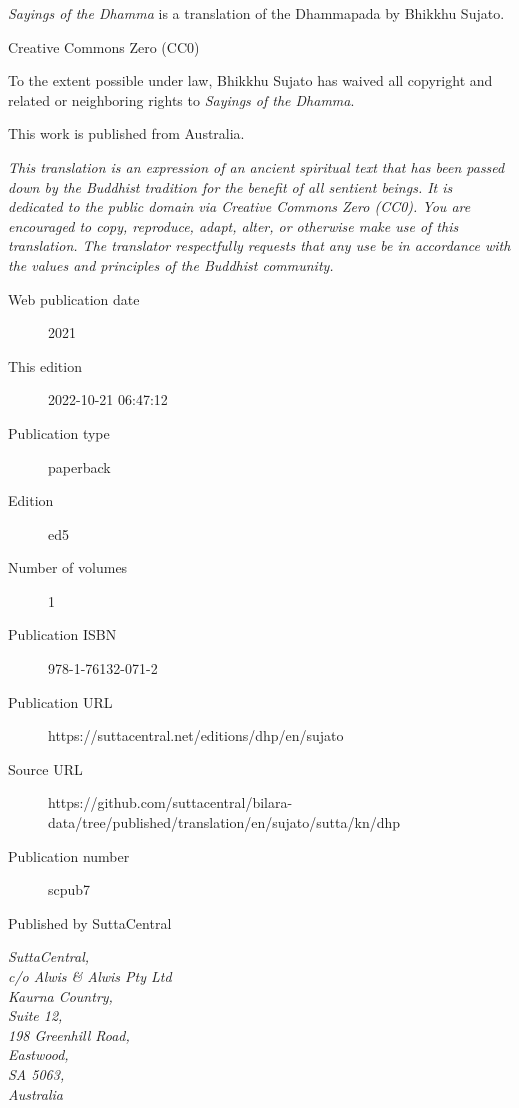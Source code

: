 \documentclass[12pt,openany]{book}%
\begin{document}
\begin{footnotesize}

\textit{Sayings of the Dhamma} is a translation of the Dhammapada by Bhikkhu Sujato.

\medskip

Creative Commons Zero (CC0)

To the extent possible under law, Bhikkhu Sujato has waived all copyright and related or neighboring rights to \textit{Sayings of the Dhamma}.

\medskip

This work is published from Australia.

\begin{center}
\textit{This translation is an expression of an ancient spiritual text that has been passed down by the Buddhist tradition for the benefit of all sentient beings. It is dedicated to the public domain via Creative Commons Zero (CC0). You are encouraged to copy, reproduce, adapt, alter, or otherwise make use of this translation. The translator respectfully requests that any use be in accordance with the values and principles of the Buddhist community.}
\end{center}

\medskip

\begin{description}
    \item[Web publication date] 2021
    \item[This edition] 2022-10-21 06:47:12
    \item[Publication type] paperback
    \item[Edition] ed5
    \item[Number of volumes] 1
    \item[Publication ISBN] 978-1-76132-071-2
    \item[Publication URL] https://suttacentral.net/editions/dhp/en/sujato
    \item[Source URL] https://github.com/suttacentral/bilara-data/tree/published/translation/en/sujato/sutta/kn/dhp
    \item[Publication number] scpub7
\end{description}

\medskip

Published by SuttaCentral

\medskip

\textit{SuttaCentral,\\
c/o Alwis \& Alwis Pty Ltd\\
Kaurna Country,\\
Suite 12,\\
198 Greenhill Road,\\
Eastwood,\\
SA 5063,\\
Australia}

\end{footnotesize}
\end{document}
